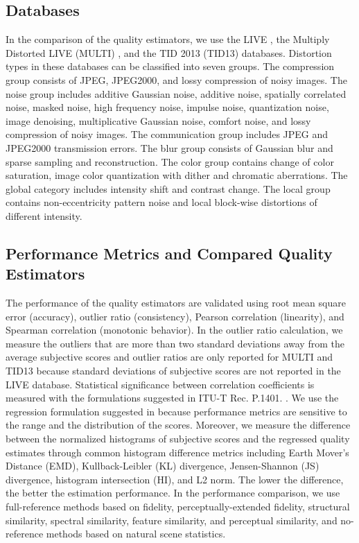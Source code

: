 \documentclass[draftcls,12pt, onecolumn]{IEEEtran}
\begin{document}
\subsection{Databases}
In the comparison of the quality estimators, we use the LIVE \cite{live2006}, the Multiply Distorted LIVE (MULTI) \cite{multi2012}, and the TID 2013 (TID13) \cite{tid13} databases. Distortion types in these databases can be classified into seven groups. The compression group consists of JPEG, JPEG2000, and lossy compression of noisy images. The noise group includes additive Gaussian noise, additive noise, spatially correlated noise, masked noise, high frequency noise, impulse noise, quantization noise, image denoising, multiplicative Gaussian noise, comfort noise, and lossy compression of noisy images. The communication group includes JPEG and JPEG2000 transmission errors. The blur group consists of Gaussian blur and sparse sampling and reconstruction. The color group contains change of color saturation, image color quantization with dither and chromatic aberrations. The global category includes intensity shift and contrast change. The local group contains non-eccentricity pattern noise and local block-wise distortions of different intensity. 











\subsection{Performance Metrics and Compared Quality Estimators}
\label{subsec:val_metrics}
The performance of the quality estimators are validated using root mean square error (accuracy), outlier ratio (consistency), Pearson correlation (linearity), and Spearman correlation (monotonic behavior). In the outlier ratio calculation, we measure the outliers that are more than two standard deviations away from the average subjective scores and outlier ratios are only reported for MULTI and TID13 because standard deviations of subjective scores are not reported in the LIVE database. Statistical significance between correlation coefficients is measured with the formulations suggested in ITU-T Rec. P.1401. \cite{ITU-T}. We use the regression formulation suggested in \cite{live2006} because performance metrics are sensitive to the range and the distribution of the scores. Moreover, we measure the difference between the normalized histograms of subjective scores and the regressed quality estimates through common histogram difference metrics including Earth Mover's Distance (EMD), Kullback-Leibler (KL) divergence,  Jensen-Shannon (JS) divergence, histogram intersection (HI), and L2 norm. The lower the difference, the better the estimation performance. In the performance comparison, we use full-reference methods based on fidelity, perceptually-extended fidelity, structural similarity, spectral similarity, feature similarity, and perceptual similarity, and no-reference methods based on natural scene statistics.
\vspace{-4.0mm}
\end{document}
